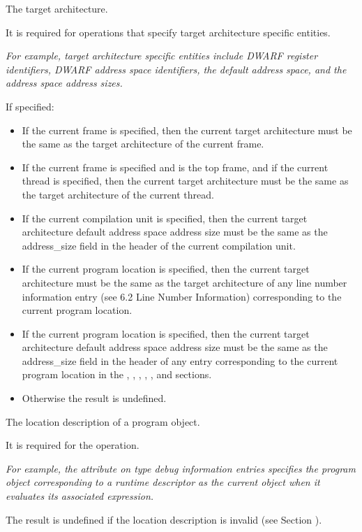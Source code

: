\begin{enumerate}[1. ]
The target architecture.

It is required for operations that specify target architecture
specific entities.

\textit{For example, target architecture specific entities include
DWARF register identifiers, DWARF address space identifiers, the
default address space, and the address space address sizes.}

If specified:
\begin{itemize}
\item If the current frame is specified, then the current target
architecture must be the same as the target architecture of the
current frame.
\item If the current frame is specified and is the top frame, and if
the current thread is specified, then the current target
architecture must be the same as the target architecture of the
current thread.
\item If the current compilation unit is specified, then the current
target architecture default address space address size must be the
same as the address\_size field in the header of the current
compilation unit.
\item If the current program location is specified, then the current
target architecture must be the same as the target architecture of
any line number information entry (see 6.2 Line Number Information)
corresponding to the current program location.
\item If the current program location is specified, then the current
target architecture default address space address size must be the
same as the address\_size field in the header of any entry
corresponding to the current program location in the
\dotdebugaddr{}, \dotdebugline{}, \dotdebugrnglists{},
\dotdebugrnglistsdwo{}, \dotdebugloclists{}, and
\dotdebugloclistsdwo{} sections.
\item Otherwise the result is undefined.
\end{itemize}

The location description of a program object.

It is required for the \DWOPpushobjectaddress{} operation.

\textit{For example, the \DWATdatalocation{} attribute on type debug
information entries specifies the program object corresponding to a
runtime descriptor as the current object when it evaluates its
associated expression.}

The result is undefined if the location description is invalid (see
Section ).


\end{enumerate}
